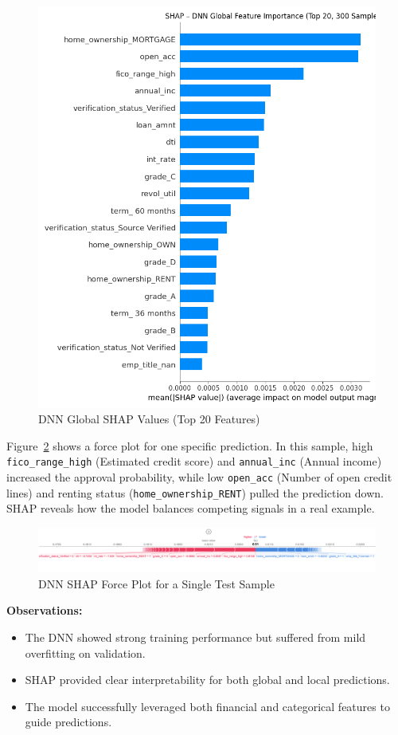 \begin{figure}[H]
    \centering
    \includegraphics[width=0.85\linewidth]{figures/shap_dnn_global.png}
    \caption{DNN Global SHAP Values (Top 20 Features)}
    \label{fig:dnn_shap_global}
\end{figure}

Figure~\ref{fig:dnn_shap_local} shows a force plot for one specific prediction. In this sample, high \texttt{fico\_range\_high} (Estimated credit score) and \texttt{annual\_inc} (Annual income) increased the approval probability, while low \texttt{open\_acc} (Number of open credit lines) and renting status (\texttt{home\_ownership\_RENT}) pulled the prediction down. SHAP reveals how the model balances competing signals in a real example.

\begin{figure}[H]
    \centering
    \includegraphics[width=0.95\linewidth]{figures/shap_dnn_force.png}
    \caption{DNN SHAP Force Plot for a Single Test Sample}
    \label{fig:dnn_shap_local}
\end{figure}

\textbf{Observations:}
\begin{itemize}
    \item The DNN showed strong training performance but suffered from mild overfitting on validation.
    \item SHAP provided clear interpretability for both global and local predictions.
    \item The model successfully leveraged both financial and categorical features to guide predictions.
\end{itemize}

